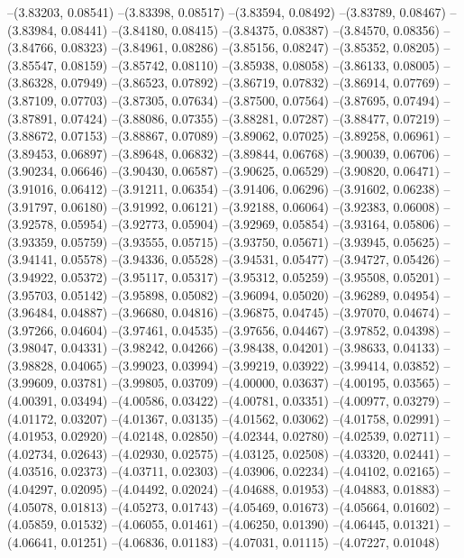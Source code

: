 --(3.83203, 0.08541)
--(3.83398, 0.08517)
--(3.83594, 0.08492)
--(3.83789, 0.08467)
--(3.83984, 0.08441)
--(3.84180, 0.08415)
--(3.84375, 0.08387)
--(3.84570, 0.08356)
--(3.84766, 0.08323)
--(3.84961, 0.08286)
--(3.85156, 0.08247)
--(3.85352, 0.08205)
--(3.85547, 0.08159)
--(3.85742, 0.08110)
--(3.85938, 0.08058)
--(3.86133, 0.08005)
--(3.86328, 0.07949)
--(3.86523, 0.07892)
--(3.86719, 0.07832)
--(3.86914, 0.07769)
--(3.87109, 0.07703)
--(3.87305, 0.07634)
--(3.87500, 0.07564)
--(3.87695, 0.07494)
--(3.87891, 0.07424)
--(3.88086, 0.07355)
--(3.88281, 0.07287)
--(3.88477, 0.07219)
--(3.88672, 0.07153)
--(3.88867, 0.07089)
--(3.89062, 0.07025)
--(3.89258, 0.06961)
--(3.89453, 0.06897)
--(3.89648, 0.06832)
--(3.89844, 0.06768)
--(3.90039, 0.06706)
--(3.90234, 0.06646)
--(3.90430, 0.06587)
--(3.90625, 0.06529)
--(3.90820, 0.06471)
--(3.91016, 0.06412)
--(3.91211, 0.06354)
--(3.91406, 0.06296)
--(3.91602, 0.06238)
--(3.91797, 0.06180)
--(3.91992, 0.06121)
--(3.92188, 0.06064)
--(3.92383, 0.06008)
--(3.92578, 0.05954)
--(3.92773, 0.05904)
--(3.92969, 0.05854)
--(3.93164, 0.05806)
--(3.93359, 0.05759)
--(3.93555, 0.05715)
--(3.93750, 0.05671)
--(3.93945, 0.05625)
--(3.94141, 0.05578)
--(3.94336, 0.05528)
--(3.94531, 0.05477)
--(3.94727, 0.05426)
--(3.94922, 0.05372)
--(3.95117, 0.05317)
--(3.95312, 0.05259)
--(3.95508, 0.05201)
--(3.95703, 0.05142)
--(3.95898, 0.05082)
--(3.96094, 0.05020)
--(3.96289, 0.04954)
--(3.96484, 0.04887)
--(3.96680, 0.04816)
--(3.96875, 0.04745)
--(3.97070, 0.04674)
--(3.97266, 0.04604)
--(3.97461, 0.04535)
--(3.97656, 0.04467)
--(3.97852, 0.04398)
--(3.98047, 0.04331)
--(3.98242, 0.04266)
--(3.98438, 0.04201)
--(3.98633, 0.04133)
--(3.98828, 0.04065)
--(3.99023, 0.03994)
--(3.99219, 0.03922)
--(3.99414, 0.03852)
--(3.99609, 0.03781)
--(3.99805, 0.03709)
--(4.00000, 0.03637)
--(4.00195, 0.03565)
--(4.00391, 0.03494)
--(4.00586, 0.03422)
--(4.00781, 0.03351)
--(4.00977, 0.03279)
--(4.01172, 0.03207)
--(4.01367, 0.03135)
--(4.01562, 0.03062)
--(4.01758, 0.02991)
--(4.01953, 0.02920)
--(4.02148, 0.02850)
--(4.02344, 0.02780)
--(4.02539, 0.02711)
--(4.02734, 0.02643)
--(4.02930, 0.02575)
--(4.03125, 0.02508)
--(4.03320, 0.02441)
--(4.03516, 0.02373)
--(4.03711, 0.02303)
--(4.03906, 0.02234)
--(4.04102, 0.02165)
--(4.04297, 0.02095)
--(4.04492, 0.02024)
--(4.04688, 0.01953)
--(4.04883, 0.01883)
--(4.05078, 0.01813)
--(4.05273, 0.01743)
--(4.05469, 0.01673)
--(4.05664, 0.01602)
--(4.05859, 0.01532)
--(4.06055, 0.01461)
--(4.06250, 0.01390)
--(4.06445, 0.01321)
--(4.06641, 0.01251)
--(4.06836, 0.01183)
--(4.07031, 0.01115)
--(4.07227, 0.01048)
